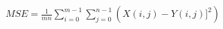 \documentclass[preview]{standalone}
\begin{document}
\begin{align*}
MSE = \frac{1}{mn}\sum_{i=0}^{m-1}\sum_{j=0}^{n-1}\left(X(i,j) - Y(i,j)]^2\right)
\end{align*}
\end{document}
